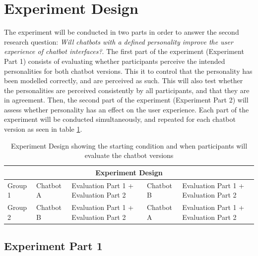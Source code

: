 \vspace{5mm} %
    
\section{Experiment Design}
    \label{experimentdesign}

The experiment will be conducted in two parts in order to answer the second research question: \textit{Will chatbots with a defined personality improve the user experience of chatbot interfaces?}. The first part of the experiment (Experiment Part 1) consists of evaluating whether participants perceive the intended personalities for both chatbot versions. This it to control that the personality has been modelled correctly, and are perceived as such. This will also test whether the personalities are perceived consistently by all participants, and that they are in agreement. Then, the second part of the experiment (Experiment Part 2) will assess whether personality has an effect on the user experience. Each part of the experiment will be conducted simultaneously, and repeated for each chatbot version as seen in table \ref{table:expdes}.

\vspace{2,5mm}

  \begin{table}[h]
  \centering
    \begin{tabular}{ |p{}||p{}||p{4cm}||p{}||p{4cm}| }
    \hline
    \multicolumn{5}{|c|}{Experiment Design} \\
    \hline
    Group 1 &   Chatbot A & Evaluation Part 1 + Evaluation Part 2 & Chatbot B & Evaluation Part 1 + Evaluation Part 2 \\
    \hline   
    Group 2 &   Chatbot B & Evaluation Part 1 + Evaluation Part 2 & Chatbot A & Evaluation Part 1 + Evaluation Part 2 \\
    \hline
    \end{tabular}
    \caption{Experiment Design showing the starting condition and when participants will evaluate the chatbot versions}
    \label{table:expdes}
    \end{table}
    
\vspace{2,5mm}

\subsection{Experiment Part 1}

